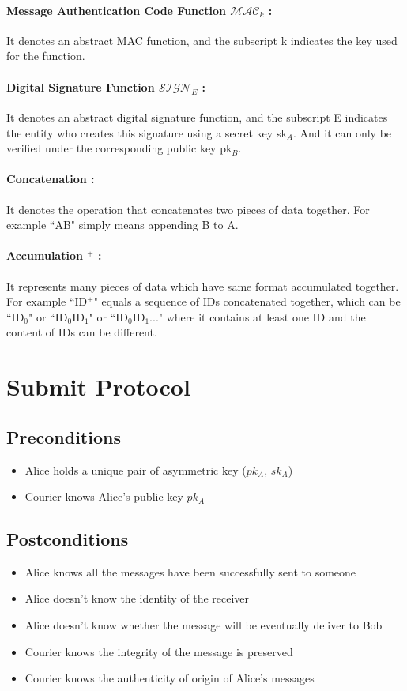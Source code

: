 \paragraph{Message Authentication Code Function $\mathcal{MAC}_k$ :}
It denotes an abstract MAC function, and the subscript k indicates the key used for the function.
\paragraph{Digital Signature Function $\mathcal{SIGN}_E$ :}
It denotes an abstract digital signature function, and the subscript E indicates the entity who creates this signature using a secret key sk$_A$. And it can only be verified under the corresponding public key pk$_B$.
\paragraph{Concatenation \textbar\textbar :}
It denotes the operation that concatenates two pieces of data together. For example ``A\textbar\textbar B" simply means appending B to A.
\paragraph{Accumulation $^+$ :}
It represents many pieces of data which have same format accumulated together. For example ``ID$^+$" equals a sequence of IDs concatenated together, which can be ``ID$_0$" or ``ID$_0$\textbar\textbar ID$_1$" or ``ID$_0$\textbar\textbar ID$_1$\textbar\textbar  ..." where it contains at least one ID and the content of IDs can be different.
\section{Submit Protocol}
\subsection{Preconditions}
\begin{itemize}
\item Alice holds a unique pair of asymmetric key ($pk_A$, $sk_A$)
\item Courier knows Alice's public key $pk_A$
\end{itemize}
\subsection{Postconditions}
\begin{itemize}
\item Alice knows all the messages have been successfully sent to someone
\item Alice doesn't know the identity of the receiver
\item Alice doesn't know whether the message will be eventually deliver to Bob
\item Courier knows the integrity of the message is preserved
\item Courier knows the authenticity of origin of Alice's messages
\end{itemize}

